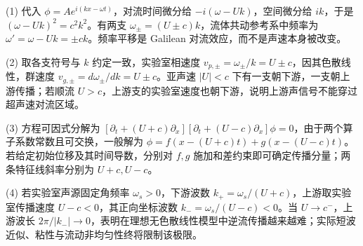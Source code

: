 (1) 代入 \(\phi=Ae^{i(kx-\omega t)}\)，对流时间微分给 \(-i(\omega-Uk)\)，空间微分给 \(ik\)，于是 \((\omega-Uk)^2=c^2k^2\)。有两支 \(\omega_\pm=(U\pm c)k\)，流体共动参考系中频率为 \(\omega'=\omega-Uk=\pm ck\)。频率平移是 Galilean 对流效应，而不是声速本身被改变。

(2) 取各支符号与 \(k\) 约定一致，实验室相速度 \(v_{p,\pm}=\omega_\pm/k=U\pm c\)，因其色散线性，群速度 \(v_{g,\pm}=d\omega_\pm/dk=U\pm c\)。亚声速 \(|U|<c\) 下有一支朝下游，一支朝上游传播；若顺流 \(U>c\)，上游支的实验室速度也朝下游，说明上游声信号不能穿过超声速对流区域。

(3) 方程可因式分解为 \([\partial_t+(U+c)\partial_x][\partial_t+(U-c)\partial_x]\phi=0\)，由于两个算子系数常数且可交换，一般解为 \(\phi=f(x-(U+c)t)+g(x-(U-c)t)\)。若给定初始位移及其时间导数，分别对 \(f,g\) 施加和差约束即可确定传播分量；两条特征线斜率分别为 \(U+c,U-c\)。

(4) 若实验室声源固定角频率 \(\omega_s>0\)，下游波数 \(k_+=\omega_s/(U+c)\)，上游取实验室传播速度 \(U-c<0\)，其正向坐标波数 \(k_-=\omega_s/(U-c)<0\)。当 \(U\to c^-\)，上游波长 \(2\pi/|k_-|\to0\)，表明在理想无色散线性模型中逆流传播越来越难；实际短波近似、粘性与流动非均匀性终将限制该极限。
